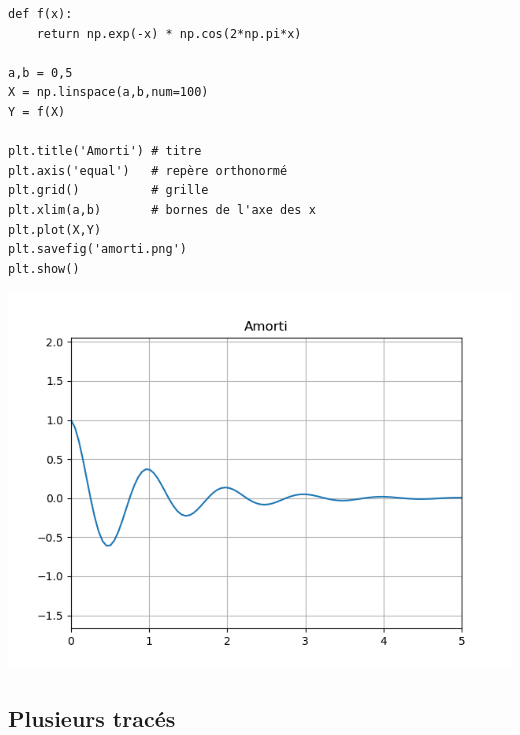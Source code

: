 \documentclass[11pt,class=report,crop=false]{standalone}
\begin{document}
\begin{minipage}{0.6\textwidth}
\begin{lstlisting}
def f(x):
	return np.exp(-x) * np.cos(2*np.pi*x)

a,b = 0,5
X = np.linspace(a,b,num=100)
Y = f(X)

plt.title('Amorti') # titre
plt.axis('equal')   # repère orthonormé
plt.grid()          # grille 
plt.xlim(a,b)       # bornes de l'axe des x
plt.plot(X,Y)
plt.savefig('amorti.png')
plt.show()
\end{lstlisting}
\end{minipage}
\begin{minipage}{0.34\textwidth}
\begin{center}
\includegraphics[scale=\myscale,scale=0.45]{figures/pythonx-amorti}
\end{center}
\end{minipage}

\subsection{Plusieurs tracés}
\end{document}
